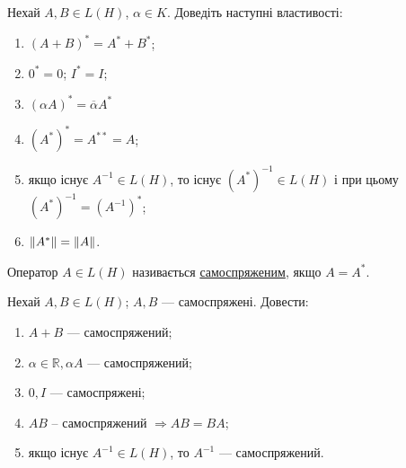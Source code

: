 \begin{exercise}
    Нехай $A, B \in L(H)$, $\alpha \in K$. Доведіть наступні властивості:
    \begin{enumerate}[label=\ukr*)]
        \item $(A+B)^* = A^* + B^*$;
        \item $0^*=0$; $I^* = I$;
        \item $(\alpha A)^* = \overline{\alpha}A^*$
        \item $(A^*)^* = A^{**} = A$;
        \item якщо існує $A^{-1} \in L(H)$, то існує $(A^*)^{-1} \in 
        L(H)$ і при цьому $(A^*)^{-1} = (A^{-1})^*$;
        \item $\left\lVert A^*\right\rVert = \left\lVert A\right\rVert$.
    \end{enumerate}
\end{exercise}

\begin{theory}
    Оператор $A \in L(H)$ називається \uline{самоспряженим}, якщо 
    $A = A^*$.
\end{theory}

\begin{exercise}
    Нехай $A, B \in L(H)$; $A, B$ --- самоспряжені. Довести:
    \begin{enumerate}[label=\ukr*)]
        \item $A+B$ --- самоспряжений;
        \item $\alpha \in \mathbb{R}, \alpha A $ 
        --- самоспряжений;
        \item $0, I$ --- самоспряжені;
        \item $AB$ -- самоспряжений $\Rightarrow AB = BA$;
        \item якщо існує $A^{-1} \in L(H)$, то $A^{-1}$ --- 
        самоспряжений.
    \end{enumerate}
\end{exercise}

